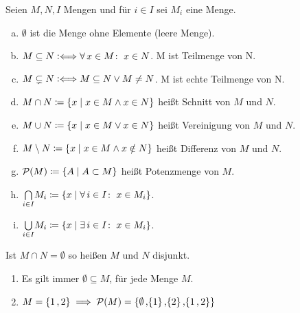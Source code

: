 \documentclass[../ana1.tex]{subfiles}
\begin{document}
\iftoggle{short}{}{\newpage}%

\begin{defi}[Mengenoperationen]
	Seien \(M,N,I \) Mengen und für \(i \in I \) sei \(M_{i} \) eine Menge.
	\begin{enumerate}[(a)]
		\item \(\emptyset \) ist die Menge ohne Elemente (leere Menge).
		\item \(M \subseteq N \mathrel{\vcentcolon\Longleftrightarrow} \forall \, x \in M \colon \; x \in N \). M ist Teilmenge von N.
		\item \(M \subsetneq N \mathrel{\vcentcolon\Longleftrightarrow} M \subseteq N \vee M \neq N \). M ist echte Teilmenge von N. 
		\item \(M \cap N \coloneqq \{x \; \vert \; x \in M \wedge x \in N\} \) heißt Schnitt von \(M \) und \(N \).
		\item \(M \cup N \coloneqq \{x \; \vert \; x \in M \vee x \in N\} \) heißt Vereinigung von \(M \) und \(N \).
		\item \(M \setminus N \coloneqq \{x \; \vert \; x \in M \wedge x \notin N\} \) heißt Differenz von \(M \) und \(N \).
		\item \(\mathcal{P}(M) \coloneqq \{A \; \vert \; A \subset M\} \) heißt Potenzmenge von \(M \).
		\item \(\underset{i \in I}{\bigcap} M_{i} \coloneqq \{x \; \vert \; \forall \, i \in I \colon \; x \in M_{i}\} \).
		\item \(\underset{i \in I}{\bigcup} M_{i} \coloneqq \{x \; \vert \; \exists \, i \in I \colon \; x \in M_{i}\} \).
	\end{enumerate}
	Ist \(M \cap N = \emptyset \) so heißen \(M \) und \(N \) disjunkt.
\end{defi}

\begin{bsp}\leavevmode
	\begin{enumerate}[(1)]
		\item Es gilt immer \(\emptyset \subseteq M \), für jede Menge \(M \).
		\item \(M = \{1\operatorname{,}2\} \implies \mathcal{P}(M) = \{\emptyset\operatorname{,}\{1\}\operatorname{,}\{2\}\operatorname{,}\{1\operatorname{,}2\}\} \)
	\end{enumerate}
\end{bsp}
\end{document}
